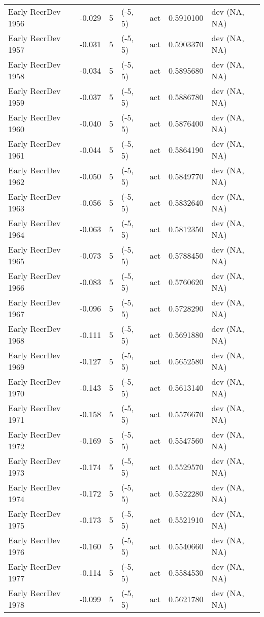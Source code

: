 \documentclass[11pt,
  english,
  a4paper,
]{article}
\begin{document}
\begin{landscape}
\begin{longtable}[t]{>{\raggedright\arraybackslash}p{6cm}lllll>{\raggedright\arraybackslash}p{4cm}}
Early RecrDev 1956 & -0.029 & 5 & (-5, 5) & act & 0.5910100 & dev (NA, NA)\\
Early RecrDev 1957 & -0.031 & 5 & (-5, 5) & act & 0.5903370 & dev (NA, NA)\\
Early RecrDev 1958 & -0.034 & 5 & (-5, 5) & act & 0.5895680 & dev (NA, NA)\\
Early RecrDev 1959 & -0.037 & 5 & (-5, 5) & act & 0.5886780 & dev (NA, NA)\\
Early RecrDev 1960 & -0.040 & 5 & (-5, 5) & act & 0.5876400 & dev (NA, NA)\\
Early RecrDev 1961 & -0.044 & 5 & (-5, 5) & act & 0.5864190 & dev (NA, NA)\\
Early RecrDev 1962 & -0.050 & 5 & (-5, 5) & act & 0.5849770 & dev (NA, NA)\\
Early RecrDev 1963 & -0.056 & 5 & (-5, 5) & act & 0.5832640 & dev (NA, NA)\\
Early RecrDev 1964 & -0.063 & 5 & (-5, 5) & act & 0.5812350 & dev (NA, NA)\\
Early RecrDev 1965 & -0.073 & 5 & (-5, 5) & act & 0.5788450 & dev (NA, NA)\\
Early RecrDev 1966 & -0.083 & 5 & (-5, 5) & act & 0.5760620 & dev (NA, NA)\\
Early RecrDev 1967 & -0.096 & 5 & (-5, 5) & act & 0.5728290 & dev (NA, NA)\\
Early RecrDev 1968 & -0.111 & 5 & (-5, 5) & act & 0.5691880 & dev (NA, NA)\\
Early RecrDev 1969 & -0.127 & 5 & (-5, 5) & act & 0.5652580 & dev (NA, NA)\\
Early RecrDev 1970 & -0.143 & 5 & (-5, 5) & act & 0.5613140 & dev (NA, NA)\\
Early RecrDev 1971 & -0.158 & 5 & (-5, 5) & act & 0.5576670 & dev (NA, NA)\\
Early RecrDev 1972 & -0.169 & 5 & (-5, 5) & act & 0.5547560 & dev (NA, NA)\\
Early RecrDev 1973 & -0.174 & 5 & (-5, 5) & act & 0.5529570 & dev (NA, NA)\\
Early RecrDev 1974 & -0.172 & 5 & (-5, 5) & act & 0.5522280 & dev (NA, NA)\\
Early RecrDev 1975 & -0.173 & 5 & (-5, 5) & act & 0.5521910 & dev (NA, NA)\\
Early RecrDev 1976 & -0.160 & 5 & (-5, 5) & act & 0.5540660 & dev (NA, NA)\\
Early RecrDev 1977 & -0.114 & 5 & (-5, 5) & act & 0.5584530 & dev (NA, NA)\\
Early RecrDev 1978 & -0.099 & 5 & (-5, 5) & act & 0.5621780 & dev (NA, NA)\\

\end{longtable}
\end{landscape}
\end{document}

